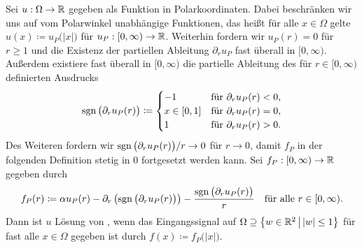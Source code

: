 Sei $u:\Omega\to\mathbb{R}$ gegeben als Funktion in Polarkoordinaten. 
Dabei beschränken wir uns auf vom Polarwinkel unabhängige Funktionen, das heißt
für alle $x\in\Omega$ gelte
$u(x)\coloneqq u_P\big(|x|\big)$ für $u_P:[0,\infty)\to\mathbb{R}$. 
Weiterhin fordern wir $u_P(r)=0$ für $r\geq 1$ und die Existenz
der partiellen Ableitung $\partial_r u_P$ fast überall in $[0,\infty)$.
Außerdem existiere fast überall in $[0,\infty)$ die partielle Ableitung
des für $r\in[0,\infty)$ definierten Ausdrucks
\begin{align*}
  \operatorname{sgn}\big(\partial_r u_P(r)\big)
  \coloneqq
  \begin{cases}
    -1 &\text{für }\partial_r u_P(r)<0,\\
    x\in[0,1] &\text{für }\partial_r u_P(r)=0,\\ 
    1 &\text{für }\partial_r u_P(r)>0.
  \end{cases}
\end{align*}
Des Weiteren fordern wir $\operatorname{sgn}\big(\partial_r u_P(r)\big)/r\to 0$ für $r\to 0$, 
damit $f_P$ in der folgenden Definition stetig in $0$ fortgesetzt werden kann.
Sei $f_P:[0,\infty)\to\mathbb{R}$ gegeben durch
\begin{align}
  \label{eq:constructionInputSignal}
  f_P(r)
  \coloneqq 
  \alpha u_P(r) - \partial_r\left(\operatorname{sgn}\big(\partial_r u_P(r)\big)\right) 
  - \frac{\operatorname{sgn}\big(\partial_r u_P(r)\big)}{r}
  \quad\text{für alle }r\in[0,\infty).
\end{align}
Dann ist $u$ Lösung von , wenn das Eingangssignal
auf $\Omega\supseteq \left\{w\in\mathbb{R}^2\,\middle|\, |w|\leq 1\right\}$ für fast
alle $x\in\Omega$ gegeben ist durch $f(x)\coloneqq f_P\big(|x|\big)$.


